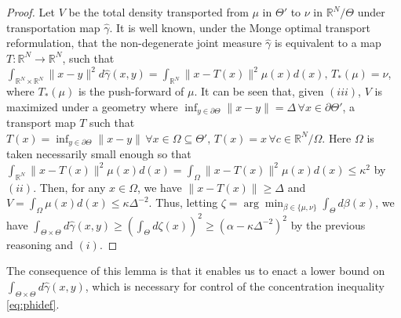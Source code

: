 \documentclass[journal,onecolumn]{IEEEtran}
\newcommand{\reals}{\mathbb{R}}
\newcommand{\dimn}{N}
\newcommand{\wass}{\mathcal{W}_2}
\newcommand{\del}{\partial}
\begin{document}
{{\begin{proof}
Let $V$ be the total density transported from $\mu$ in $\Theta'$ to $\nu$ in $\reals^{\dimn}/\Theta$ under transportation map $\hat{\gamma}$. It is well known, under the Monge optimal transport reformulation, that the non-degenerate joint measure $\hat{\gamma}$ is equivalent to a map $T: \reals^{\dimn} \to \reals^{\dimn}$, such that $\int_{\reals^{\dimn}\times\reals^{\dimn}}\|x-y\|^2d\hat{\gamma}(x,y) = \int_{\reals^{\dimn}}\|x-T(x)\|^2\mu(x)d(x), \, T_*(\mu) = \nu$, where $T_*(\mu)$ is the push-forward of $\mu$. It can be seen that, given $(iii)$, $V$ is maximized under a geometry where $\inf_{y\in\del\Theta}\|x-y\| = \Delta\,\forall x\in \del\Theta'$, a transport map $T$ such that $T(x) = \inf_{y\in\del\Theta}\|x-y\| \, \forall x\in \Omega \subseteq \Theta', \,T(x) = x \, \forall c\in\reals^{\dimn}/\Omega$. Here $\Omega$ is taken necessarily small enough so that $\int_{\reals^{\dimn}}\|x-T(x)\|^2\mu(x)d(x) = \int_{\Omega}\|x-T(x)\|^2\mu(x)d(x) \leq \kappa^2$ by $(ii)$. Then, for any $x\in\Omega$, we have $\|x-T(x)\|\geq \Delta$ and $V = \int_{\Omega}\mu(x)d(x) \leq \kappa\Delta^{-2}$. Thus, letting $\zeta = \arg\min_{\beta\in\{\mu,\nu\}}\int_{\Theta}d\beta(x)$, we have $\int_{\Theta \times \Theta}d\hat{\gamma}(x,y) \geq \left(\int_{\Theta}d\zeta(x)\right)^2 \geq (\alpha - \kappa\Delta^{-2})^2$ by the previous reasoning and $(i)$. 
\end{proof}}

{\color{black}The consequence of this lemma is that it enables us to enact a lower bound on $\int_{\Theta \times \Theta} d\hat{\gamma}(x,y)$, which is necessary for control of the concentration inequality \eqref{eq:phidef}.}




}
\end{document}
